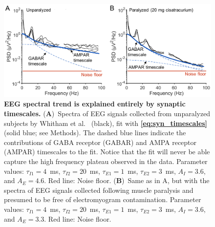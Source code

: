 \begin{figure}[t!]
    \centering
    \includegraphics[width=13.2cm]{Figures/chapter3/figure5.png}
    \caption{\textbf{EEG spectral trend is explained entirely by synaptic timescales.} (\textbf{A})~Spectra of EEG signals collected from unparalyzed subjects by Whitham et al.~\cite{Whitham2007} (black), fit with \textbf{\ref{eq:syn_timescales}} (solid blue; see Methods). The dashed blue lines indicate the contributions of GABA receptor (GABAR) and AMPA receptor (AMPAR) timescales to the fit. Notice that the fit will never be able capture the high frequency plateau observed in the data. Parameter values: $\tau_{I1}=4$~\unit{\milli\second}, $\tau_{I2}=20$~\unit{\milli\second}, $\tau_{E1}=1$~\unit{\milli\second}, $\tau_{E2}=3$~\unit{\milli\second}, $A_I=3.6$, and $A_E=4.6$.  Red line: Noise floor. (\textbf{B})~Same as in A, but with the spectra of EEG signals collected following muscle paralysis and presumed to be free of electromyogram contamination. Parameter values: $\tau_{I1}=4$~\unit{\milli\second}, $\tau_{I2}=20$~\unit{\milli\second}, $\tau_{E1}=1$~\unit{\milli\second}, $\tau_{E2}=3$~\unit{\milli\second}, $A_I=3.6$, and $A_E=3.3$. Red line: Noise floor.}
    \label{fig:paralytic_data}
\end{figure}

